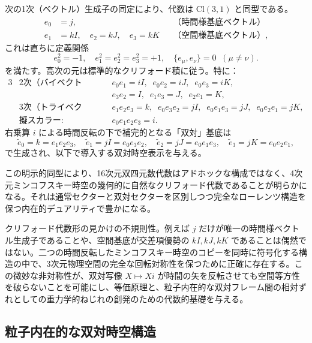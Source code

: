 \documentclass[a4paper]{article}
\begin{document}
次の1次（ベクトル）生成子の同定により、代数は $\mathrm{Cl}(3,1)$ と同型である。
\begin{align*}
  e_0 &= j,                    & &\text{（時間様基底ベクトル）}\\[4pt]
  e_1 &= kI, \quad e_2 = kJ, \quad e_3 = kK & &\text{（空間様基底ベクトル）},
\end{align*}
これは直ちに定義関係
\[
e_0^2 = -1, \quad e_1^2 = e_2^2 = e_3^2 = +1, \quad \{e_\mu,e_\nu\} = 0 \;\; (\mu \neq \nu).
\]
を満たす。高次の元は標準的なクリフォード積に従う。特に：
\begin{alignat*}{3}
  &\text{2次（バイベクトル）:}  &\quad& e_0e_1 = iI, \;\; e_0e_2 = iJ, \;\; e_0e_3 = iK, \\
  &&& e_3e_2 = I,   \;\; e_1e_3 = J,   \;\; e_2e_1 = K, \\[6pt]
  &\text{3次（トライベクトル）:} && e_1e_2e_3 = k, \;\; e_0e_3e_2 = jI, \;\; e_0e_1e_3 = jJ, \;\; e_0e_2e_1 = jK, \\[6pt]
  &\text{擬スカラー:}        && e_0e_1e_2e_3 = i.
\end{alignat*}
右乗算 $i$ による時間反転の下で補完的となる「双対」基底は
\[
\tilde{e}_0 = k = e_1e_2e_3, \quad \tilde{e}_1 = jI = e_0e_3e_2, \quad \tilde{e}_2 = jJ = e_0e_1e_3, \quad \tilde{e}_3 = jK = e_0e_2e_1,
\]
で生成され、以下で導入する双対時空表示を与える。

この明示的同型により、16次元双四元数代数はアドホックな構成ではなく、4次元ミンコフスキー時空の幾何的に自然なクリフォード代数であることが明らかになる。それは通常セクターと双対セクターを区別しつつ完全なローレンツ構造を保つ内在的デュアリティで豊かになる。

クリフォード代数形の見かけの不規則性。例えば $j$ だけが唯一の時間様ベクトル生成子であることや、空間基底が交差項優勢の $kI,kJ,kK$ であることは偶然ではない。二つの時間反転したミンコフスキー時空のコピーを同時に符号化する構造の中で、3次元物理空間の完全な回転対称性を保つために正確に存在する。この微妙な非対称性が、双対写像 $X \mapsto Xi$ が時間の矢を反転させても空間等方性を破らないことを可能にし、等価原理と、粒子内在的な双対フレーム間の相対ずれとしての重力学的ねじれの創発のための代数的基礎を与える。

\subsection{粒子内在的な双対時空構造}
\end{document}
